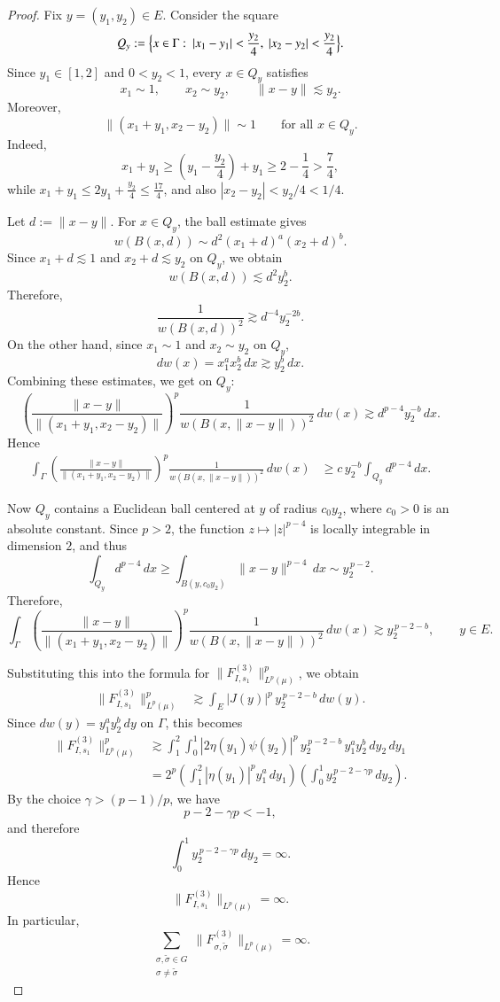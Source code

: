 \documentclass[12pt]{amsart}
\begin{document}
\begin{proof}
Fix \(y=(y_1,y_2)\in E\). Consider the square
\[
Q_y:=\Bigl\{x\in \Gamma:\ |x_1-y_1|<\frac{y_2}{4},\ |x_2-y_2|<\frac{y_2}{4}\Bigr\}.
\]
Since \(y_1\in[1,2]\) and \(0<y_2<1\), every \(x\in Q_y\) satisfies
\[
x_1\sim 1,\qquad x_2\sim y_2,\qquad \|x-y\|\lesssim y_2.
\]
Moreover,
\[
\|(x_1+y_1,x_2-y_2)\|\sim 1
\qquad\text{for all }x\in Q_y.
\]
Indeed,
\[
x_1+y_1\ge \left(y_1-\frac{y_2}{4}\right)+y_1\ge 2-\frac14>\frac74,
\]
while \(x_1+y_1\le 2y_1+\frac{y_2}{4}\le \frac{17}{4}\), and also \(|x_2-y_2|<y_2/4<1/4\).

Let \(d:=\|x-y\|\). For \(x\in Q_y\), the ball estimate gives
\[
w(B(x,d))
\sim d^2(x_1+d)^a(x_2+d)^b.
\]
Since \(x_1+d\lesssim 1\) and \(x_2+d\lesssim y_2\) on \(Q_y\), we obtain
\[
w(B(x,d))\lesssim d^2 y_2^b.
\]
Therefore,
\[
\frac{1}{w(B(x,d))^2}\gtrsim d^{-4}y_2^{-2b}.
\]
On the other hand, since \(x_1\sim 1\) and \(x_2\sim y_2\) on \(Q_y\),
\[
dw(x)=x_1^a x_2^b\,dx\gtrsim y_2^b\,dx.
\]
Combining these estimates, we get on \(Q_y\):
\[
\left(\frac{\|x-y\|}{\|(x_1+y_1,x_2-y_2)\|}\right)^p
\frac{1}{w(B(x,\|x-y\|))^2}\,dw(x)
\gtrsim
d^{p-4}y_2^{-b}\,dx.
\]
Hence
\begin{align*}
\int_\Gamma
\left(\frac{\|x-y\|}{\|(x_1+y_1,x_2-y_2)\|}\right)^p
\frac{1}{w(B(x,\|x-y\|))^2}\,dw(x)
&\ge
c\,y_2^{-b}\int_{Q_y} d^{p-4}\,dx.
\end{align*}

Now \(Q_y\) contains a Euclidean ball centered at \(y\) of radius \(c_0y_2\), where \(c_0>0\) is an absolute constant. Since \(p>2\), the function \(z\mapsto |z|^{p-4}\) is locally integrable in dimension \(2\), and thus
\[
\int_{Q_y} d^{p-4}\,dx
\ge
\int_{B(y,c_0y_2)} \|x-y\|^{p-4}\,dx
\sim
y_2^{\,p-2}.
\]
Therefore,
\[
\int_\Gamma
\left(\frac{\|x-y\|}{\|(x_1+y_1,x_2-y_2)\|}\right)^p
\frac{1}{w(B(x,\|x-y\|))^2}\,dw(x)
\gtrsim
y_2^{\,p-2-b},
\qquad y\in E.
\]

Substituting this into the formula for \(\|F_{I,s_1}^{(3)}\|_{L^p(\mu)}^p\), we obtain
\begin{align*}
\|F_{I,s_1}^{(3)}\|_{L^p(\mu)}^p
&\gtrsim
\int_E |J(y)|^p\, y_2^{\,p-2-b}\,dw(y).
\end{align*}
Since \(dw(y)=y_1^a y_2^b\,dy\) on \(\Gamma\), this becomes
\begin{align*}
\|F_{I,s_1}^{(3)}\|_{L^p(\mu)}^p
&\gtrsim
\int_1^2\int_0^1
|2\eta(y_1)\psi(y_2)|^p\, y_2^{\,p-2-b}\, y_1^a y_2^b\,dy_2\,dy_1 \\
&=
2^p\left(\int_1^2 |\eta(y_1)|^p y_1^a\,dy_1\right)
\left(\int_0^1 y_2^{\,p-2-\gamma p}\,dy_2\right).
\end{align*}
By the choice \(\gamma>(p-1)/p\), we have
\[
p-2-\gamma p<-1,
\]
and therefore
\[
\int_0^1 y_2^{\,p-2-\gamma p}\,dy_2=\infty.
\]
Hence
\[
\|F_{I,s_1}^{(3)}\|_{L^p(\mu)}=\infty.
\]
In particular,
\[
\sum_{\substack{\sigma,\tilde{\sigma}\in G\\ \sigma\neq \tilde{\sigma}}}
\|F_{\sigma,\tilde{\sigma}}^{(3)}\|_{L^p(\mu)}
=\infty.
\]


\end{proof}
\end{document}

